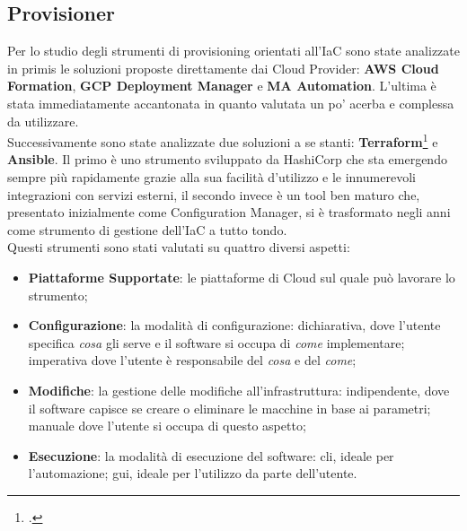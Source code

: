 \subsection{Provisioner}
Per lo studio degli strumenti di provisioning orientati all'IaC sono state analizzate in primis le soluzioni proposte direttamente dai Cloud Provider: \textbf{AWS Cloud Formation}, \textbf{GCP Deployment Manager} e \textbf{MA Automation}. L'ultima è stata immediatamente accantonata in quanto valutata un po' acerba e complessa da utilizzare. \\
Successivamente sono state analizzate due soluzioni a se stanti: \textbf{Terraform}\footcite{site:terraform} e \textbf{Ansible}. Il primo è uno strumento sviluppato da HashiCorp che sta emergendo sempre più rapidamente grazie alla sua facilità d'utilizzo e le innumerevoli integrazioni con servizi esterni, il secondo invece è un tool ben maturo che, presentato inizialmente come Configuration Manager, si è trasformato negli anni come strumento di gestione dell'IaC a tutto tondo.\\
Questi strumenti sono stati valutati su quattro diversi aspetti:
\begin{itemize}
	\item \textbf{Piattaforme Supportate}: le piattaforme di Cloud sul quale può lavorare lo strumento;
	\item \textbf{Configurazione}: la modalità di configurazione: dichiarativa, dove l'utente specifica \textit{cosa} gli serve e il software si occupa di \textit{come} implementare; imperativa dove l'utente è responsabile del \textit{cosa} e del \textit{come};
	\item \textbf{Modifiche}: la gestione delle modifiche all'infrastruttura: indipendente, dove il software capisce se creare o eliminare le macchine in base ai parametri; manuale dove l'utente si occupa di questo aspetto;
	\item \textbf{Esecuzione}: la modalità di esecuzione del software: \gls{cli}, ideale per l'automazione; \gls{gui}, ideale per l'utilizzo da parte dell'utente.
\end{itemize}

